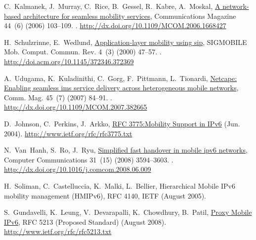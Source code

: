 \documentclass[preprint,12pt]{elsarticle}
\begin{document}
\begin{thebibliography}{10}
C.~Kalmanek, J.~Murray, C.~Rice, B.~Gessel, R.~Kabre, A.~Moskal,
  \href{http://dx.doi.org/10.1109/MCOM.2006.1668427}{A network-based
  architecture for seamless mobility services}, Communications Magazine 44~(6)
  (2006) 103--109.
\newblock \href {http://dx.doi.org/10.1109/MCOM.2006.1668427}
  {}.
\newline\urlprefix\url{http://dx.doi.org/10.1109/MCOM.2006.1668427}

H.~Schulzrinne, E.~Wedlund,
  \href{http://doi.acm.org/10.1145/372346.372369}{Application-layer mobility
  using sip}, SIGMOBILE Mob. Comput. Commun. Rev. 4~(3) (2000) 47--57.
\newblock \href {http://dx.doi.org/10.1145/372346.372369}
  {}.
\newline\urlprefix\url{http://doi.acm.org/10.1145/372346.372369}

A.~Udugama, K.~Kuladinithi, C.~Gorg, F.~Pittmann, L.~Tionardi,
  \href{http://dx.doi.org/10.1109/MCOM.2007.382665}{Netcape: Enabling seamless
  ims service delivery across heterogeneous mobile networks}, Comm. Mag. 45~(7)
  (2007) 84--91.
\newblock \href {http://dx.doi.org/10.1109/MCOM.2007.382665}
  {}.
\newline\urlprefix\url{http://dx.doi.org/10.1109/MCOM.2007.382665}

D.~Johnson, C.~Perkins, J.~Arkko,
  \href{http://www.ietf.org/rfc/rfc3775.txt}{{RFC 3775:Mobility Support in
  IPv6}} (Jun. 2004).
\newline\urlprefix\url{http://www.ietf.org/rfc/rfc3775.txt}

N.~Van~Hanh, S.~Ro, J.~Ryu,
  \href{http://dx.doi.org/10.1016/j.comcom.2008.06.009}{Simplified fast
  handover in mobile ipv6 networks}, Computer Communications 31~(15) (2008)
  3594--3603.
\newblock \href {http://dx.doi.org/10.1016/j.comcom.2008.06.009}
  {}.
\newline\urlprefix\url{http://dx.doi.org/10.1016/j.comcom.2008.06.009}

H.~Soliman, C.~Castelluccia, K.~Malki, L.~Bellier, Hierarchical {M}obile {IP}v6
  mobility management ({HMIP}v6), RFC 4140, IETF (August 2005).

S.~Gundavelli, K.~Leung, V.~Devarapalli, K.~Chowdhury, B.~Patil,
  \href{http://www.ietf.org/rfc/rfc5213.txt}{{Proxy Mobile IPv6}}, RFC 5213
  (Proposed Standard) (August 2008).
\newline\urlprefix\url{http://www.ietf.org/rfc/rfc5213.txt}


\end{thebibliography}
\end{document}
